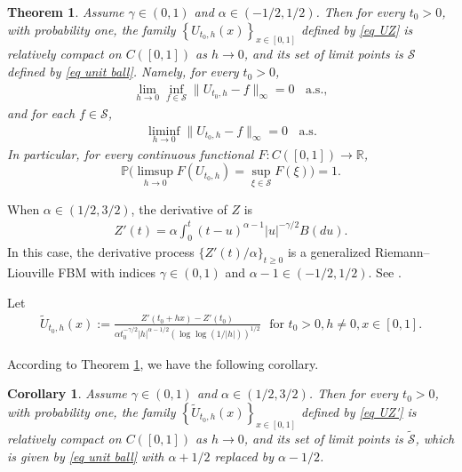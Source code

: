 \documentclass[11pt, reqno]{amsart}
\numberwithin{equation}{section}
\newtheorem{theorem}{Theorem}[section]
\newtheorem{corollary}{Corollary}[section]
\newcommand{\1}{{\bf 1}}
\newcommand{\2}{{\bf 2}}
\begin{document}
   \begin{theorem}\label{thm local LILZ}      {Assume $\gamma\in (0,1)$ and $\alpha\in(-1/2, 1/2)$}. Then   for every  $t_0>0$,
   with probability one, the family $\left\{U_{t_0, h}
   (x)\right\}_{x\in [0,1]} $ defined by \eqref{eq UZ}  is 
   relatively compact on $C([0,1])$ as  $h\rightarrow 0 $, and
   its set of limit points is $\mathcal S$ defined by 
   \eqref{eq unit ball}. Namely, for every $t_0>0$,  
    \begin{align}\label{eq equiv1b}
 \lim_{h\rightarrow 0 }\inf_{f\in \mathcal S} \|U_{t_0, h}-f \|_{\infty}=0 \ \ \ \ \text{a.s.},
 \end{align}
 and for each $f\in \mathcal S$,
    \begin{align}\label{eq equiv2b}
 \liminf_{h\rightarrow 0 } \|U_{t_0, h}-f \|_{\infty}=0 \ \ \ \ \text{a.s.}
 \end{align}
  In particular,  for every continuous functional $F: C([0,1])\rightarrow \mathbb R$,
 \begin{equation}\label{eq continuity2}
 \mathbb P\bigg(\limsup_{h\rightarrow0} F(U_{t_0, h})=\sup_{\xi\in \mathcal S}F(\xi) \bigg)=1.
 \end{equation}
   \end{theorem}

  When $\alpha\in (1/2, 3/2)$, the derivative of $Z$ is  
      \begin{equation*}
\begin{split}
  {Z'(t)=\alpha \int_{0}^t (t-u)^{\alpha-1}|u|^{-\gamma/2}B(du). }
\end{split}
\end{equation*} 
In this case,  the derivative process $\{Z'(t)/\alpha\}_{t\ge0}$ is a generalized Riemann–Liouville FBM with indices $\gamma\in (0,1)$ and 
$\alpha-1\in (-1/2,   1/2)$.  See \cite[Lemma 3.3]{WX2021a}.
  
  Let
 \begin{align}\label{eq UZ'}
   \widetilde U_{t_0, h}(x):=\frac{Z'(t_0+hx)-Z'(t_0)}{\alpha t_0^{-\gamma/2}|h|^{\alpha-1/2}\left(  {\log\log}(1/|h|)\right)^{1/2}} \ \ \ \text{for }    
 t_0>0, h\neq 0,  x\in [0,1].
   \end{align}
   
According to Theorem \ref{thm local LILZ}, we have   the following  corollary. 
       \begin{corollary}\label{coro local LILZ'}      {Assume $\gamma\in (0,1)$ and $\alpha\in(1/2, 3/2)$}. Then   for every  $t_0>0$,
   with probability one, the family $\left\{\widetilde U_{t_0, h}(x)\right\}_{x\in [0,1]}$ defined by \eqref{eq UZ'}
     is relatively compact on $C([0,1])$ as  $h\rightarrow 0 $, and its set of   limit points is $\widetilde{\mathcal S}$, which is   given by \eqref{eq unit ball} with  $\alpha+1/2$ replaced by $\alpha-1/2$.
   \end{corollary}
 
\end{document}
